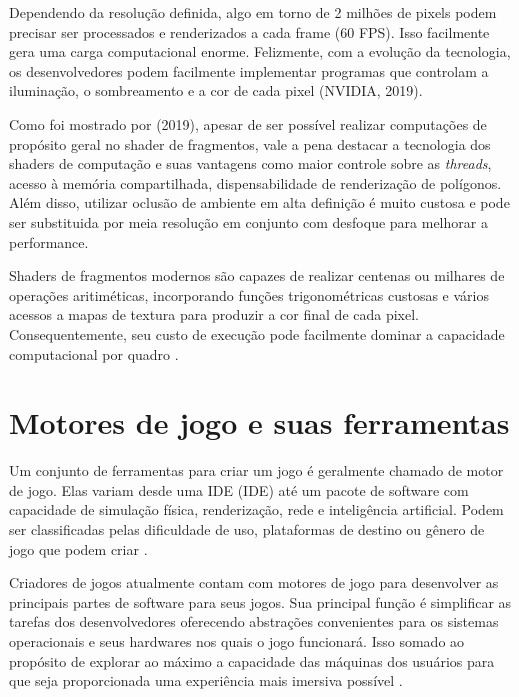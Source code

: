 Dependendo da resolução definida, algo em torno de 2 milhões de pixels podem precisar ser processados e renderizados a cada frame (60 FPS). Isso facilmente gera uma carga computacional enorme. Felizmente, com a evolução da tecnologia, os desenvolvedores podem facilmente implementar programas que controlam a iluminação, o sombreamento e a cor de cada pixel (NVIDIA, 2019)\nocite{fragShader}.

Como foi mostrado por  (2019), apesar de ser possível realizar computações de propósito geral no shader de fragmentos, vale a pena destacar a tecnologia dos shaders de computação e suas vantagens como maior controle sobre as \textit{threads}, acesso à memória compartilhada, dispensabilidade de renderização de polígonos. Além disso, utilizar oclusão de ambiente em alta definição é muito custosa e pode ser substituida por meia resolução em conjunto com desfoque para melhorar a performance.

Shaders de fragmentos modernos são capazes de realizar centenas ou milhares de operações aritiméticas, incorporando funções trigonométricas custosas e vários acessos a mapas de textura para produzir a cor final de cada pixel. Consequentemente, seu custo de execução pode facilmente dominar a capacidade computacional por quadro \cite{lei2008acm}.

\section{Motores de jogo e suas ferramentas}
\label{sec:motores-jogo-ferramentas}

Um conjunto de ferramentas para criar um jogo é geralmente chamado de motor de jogo. Elas variam desde uma IDE (\acrlong{IDE}) até um pacote de software com capacidade de simulação física, renderização, rede e inteligência artificial. Podem ser classificadas pelas dificuldade de uso, plataformas de destino ou gênero de jogo que podem criar \cite{compGameLang}. 

Criadores de jogos atualmente contam com motores de jogo para desenvolver as principais partes de software para seus jogos. Sua principal função é simplificar as tarefas dos desenvolvedores oferecendo abstrações convenientes para os sistemas operacionais e seus hardwares nos quais o jogo funcionará. Isso somado ao propósito de explorar ao máximo a capacidade das máquinas dos usuários para que seja proporcionada uma experiência mais imersiva possível \cite{simon2015unity}.



